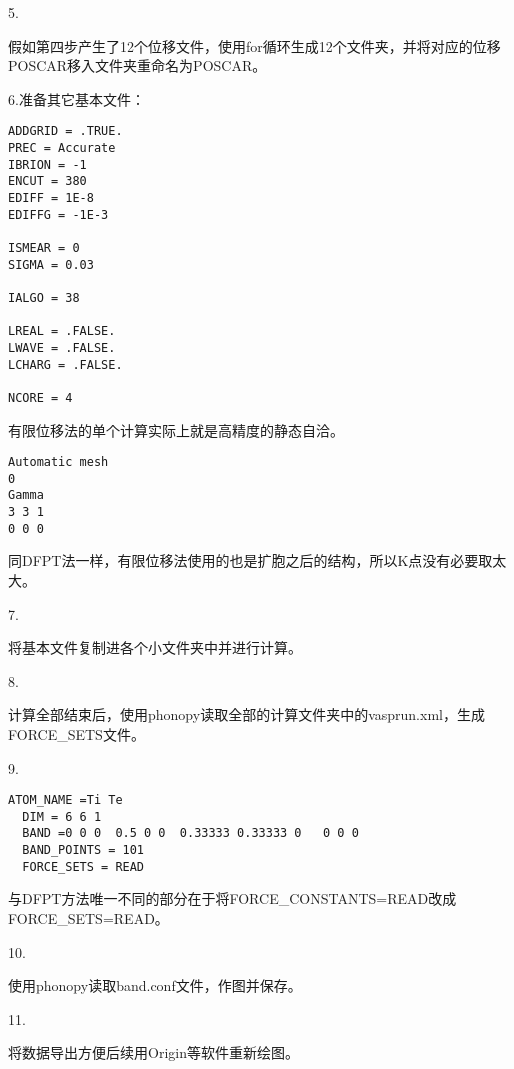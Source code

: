 5.

假如第四步产生了12个位移文件，使用for循环生成12个文件夹，并将对应的位移POSCAR移入文件夹重命名为POSCAR。

6.准备其它基本文件：

\begin{lstlisting}[caption=INCAR]
ADDGRID = .TRUE.
PREC = Accurate
IBRION = -1
ENCUT = 380
EDIFF = 1E-8
EDIFFG = -1E-3

ISMEAR = 0
SIGMA = 0.03

IALGO = 38

LREAL = .FALSE.
LWAVE = .FALSE.
LCHARG = .FALSE.

NCORE = 4
\end{lstlisting}

\begin{attention}
 有限位移法的单个计算实际上就是高精度的静态自洽。
\end{attention}

\begin{lstlisting}[caption=KPOINTS]
Automatic mesh
0
Gamma
3 3 1
0 0 0
\end{lstlisting}

\begin{attention}
 同DFPT法一样，有限位移法使用的也是扩胞之后的结构，所以K点没有必要取太大。
\end{attention}

7.

将基本文件复制进各个小文件夹中并进行计算。

8.

计算全部结束后，使用phonopy读取全部的计算文件夹中的vasprun.xml，生成FORCE\_SETS文件。

9.

\begin{lstlisting}[caption=band.conf]
  ATOM_NAME =Ti Te
  DIM = 6 6 1
  BAND =0 0 0  0.5 0 0  0.33333 0.33333 0   0 0 0
  BAND_POINTS = 101
  FORCE_SETS = READ
\end{lstlisting}

与DFPT方法唯一不同的部分在于将FORCE\_CONSTANTS=READ改成FORCE\_SETS=READ。

10.

使用phonopy读取band.conf文件，作图并保存。

11.

将数据导出方便后续用Origin等软件重新绘图。
